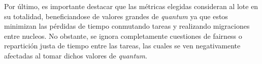 Por último, es importante destacar que las métricas elegidas consideran al lote en su totalidad, beneficiandose de valores grandes de \textit{quantum} ya que estos minimizan las pérdidas de tiempo conmutando tareas y realizando migraciones entre nucleos. No obstante, se ignora completamente cuestiones de fairness o repartición justa de tiempo entre las tareas, las cuales se ven negativamente afectadas al tomar dichos valores de \textit{quantum}.
